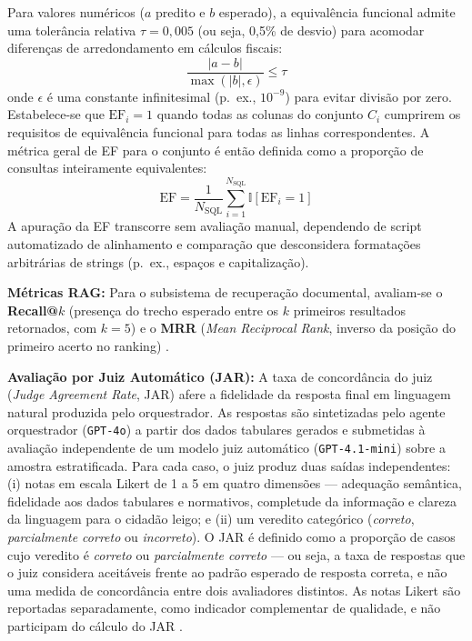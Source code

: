 \documentclass[12pt]{article}
\begin{document}
Para valores numéricos ($a$ predito e $b$ esperado), a equivalência funcional admite uma tolerância relativa $\tau = 0{,}005$ (ou seja, 0,5\% de desvio) para acomodar diferenças de arredondamento em cálculos fiscais:
\begin{equation}
\frac{|a - b|}{\max(|b|, \epsilon)} \leq \tau
\end{equation}
onde $\epsilon$ é uma constante infinitesimal (p.~ex., $10^{-9}$) para evitar divisão por zero.
Estabelece-se que $\text{EF}_i = 1$ quando todas as colunas do conjunto $C_i$ cumprirem os requisitos de equivalência funcional para todas as linhas correspondentes. A métrica geral de EF para o conjunto é então definida como a proporção de consultas inteiramente equivalentes:
\begin{equation}
\text{EF} = \frac{1}{N_{\text{SQL}}} \sum_{i=1}^{N_{\text{SQL}}} \mathbb{I}\!\left[\text{EF}_i = 1\right]
\end{equation}
A apuração da EF transcorre sem avaliação manual, dependendo de script automatizado de alinhamento e comparação que desconsidera formatações arbitrárias de strings (p.~ex., espaços e capitalização).

\textbf{Métricas RAG:} Para o subsistema de recuperação documental, avaliam-se o \textbf{Recall@}$k$ (presença do trecho esperado entre os $k$ primeiros resultados retornados, com $k=5$) e o \textbf{MRR} (\textit{Mean Reciprocal Rank}, inverso da posição do primeiro acerto no ranking) \cite{BaezaYates2011}.

\textbf{Avaliação por Juiz Automático (JAR):} A taxa de concordância do juiz (\textit{Judge Agreement Rate}, JAR) afere a fidelidade da resposta final em linguagem natural produzida pelo orquestrador. As respostas são sintetizadas pelo agente orquestrador (\texttt{GPT-4o}) a partir dos dados tabulares gerados e submetidas à avaliação independente de um modelo juiz automático (\texttt{GPT-4.1-mini}) sobre a amostra estratificada. Para cada caso, o juiz produz duas saídas independentes: (i) notas em escala Likert de 1 a 5 em quatro dimensões --- adequação semântica, fidelidade aos dados tabulares e normativos, completude da informação e clareza da linguagem para o cidadão leigo; e (ii) um veredito categórico (\textit{correto}, \textit{parcialmente correto} ou \textit{incorreto}). O JAR é definido como a proporção de casos cujo veredito é \textit{correto} ou \textit{parcialmente correto} --- ou seja, a taxa de respostas que o juiz considera aceitáveis frente ao padrão esperado de resposta correta, e não uma medida de concordância entre dois avaliadores distintos. As notas Likert são reportadas separadamente, como indicador complementar de qualidade, e não participam do cálculo do JAR \cite{Zheng2023LLMJudge}.
\end{document}
